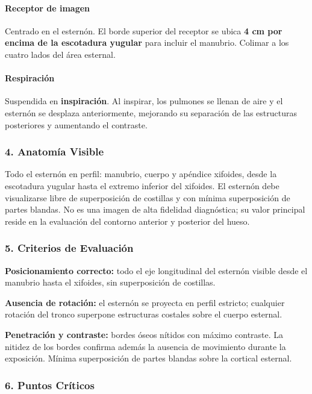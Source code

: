 	\paragraph{Receptor de imagen}
	Centrado en el esternón. El borde superior del receptor se ubica \textbf{4 cm por encima de la escotadura yugular} para incluir el manubrio. Colimar a los cuatro lados del área esternal.
	
	\paragraph{Respiración}
	Suspendida en \textbf{inspiración}. Al inspirar, los pulmones se llenan de aire y el esternón se desplaza anteriormente, mejorando su separación de las estructuras posteriores y aumentando el contraste.
	
	\subsubsection*{4. Anatomía Visible}
	
	Todo el esternón en perfil: manubrio, cuerpo y apéndice xifoides, desde la escotadura yugular hasta el extremo inferior del xifoides. El esternón debe visualizarse libre de superposición de costillas y con mínima superposición de partes blandas. No es una imagen de alta fidelidad diagnóstica; su valor principal reside en la evaluación del contorno anterior y posterior del hueso.
	
	\subsubsection*{5. Criterios de Evaluación}
	
	\textbf{Posicionamiento correcto:} todo el eje longitudinal del esternón visible desde el manubrio hasta el xifoides, sin superposición de costillas.
	
	\textbf{Ausencia de rotación:} el esternón se proyecta en perfil estricto; cualquier rotación del tronco superpone estructuras costales sobre el cuerpo esternal.
	
	\textbf{Penetración y contraste:} bordes óseos nítidos con máximo contraste. La nitidez de los bordes confirma además la ausencia de movimiento durante la exposición. Mínima superposición de partes blandas sobre la cortical esternal.
	
	\subsubsection*{6. Puntos Críticos}
	
